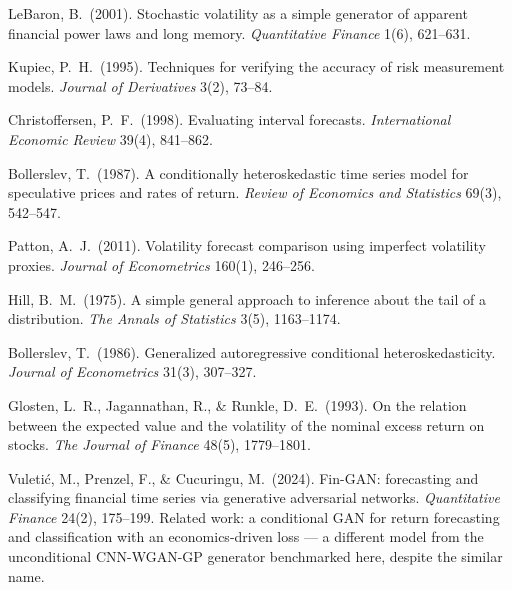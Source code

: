\documentclass[11pt,a4paper]{article}
\makeatletter
\DeclareRobustCommand{\_}{\ifmmode\nfss@text{\textunderscore}\else\textunderscore\allowbreak\fi}
\makeatother
\begin{document}
{\begin{enumerate}[label={\textbf{[\arabic*]}},leftmargin=2.8em,itemsep=4pt,parsep=0pt,topsep=2pt]
\item \hypertarget{R:33}{}%
  LeBaron, B.\ (2001). Stochastic volatility as a simple generator of apparent financial power laws and long memory. \textit{Quantitative Finance} 1(6), 621--631.

\item \hypertarget{R:34}{}%
  Kupiec, P.\ H.\ (1995). Techniques for verifying the accuracy of risk measurement models. \textit{Journal of Derivatives} 3(2), 73--84.

\item \hypertarget{R:35}{}%
  Christoffersen, P.\ F.\ (1998). Evaluating interval forecasts. \textit{International Economic Review} 39(4), 841--862.

\item \hypertarget{R:36}{}%
  Bollerslev, T.\ (1987). A conditionally heteroskedastic time series model for speculative prices and rates of return. \textit{Review of Economics and Statistics} 69(3), 542--547.

\item \hypertarget{R:37}{}%
  Patton, A.\ J.\ (2011). Volatility forecast comparison using imperfect volatility proxies. \textit{Journal of Econometrics} 160(1), 246--256.

\item \hypertarget{R:38}{}%
  Hill, B.\ M.\ (1975). A simple general approach to inference about the tail of a distribution. \textit{The Annals of Statistics} 3(5), 1163--1174.

\item \hypertarget{R:39}{}%
  Bollerslev, T.\ (1986). Generalized autoregressive conditional heteroskedasticity. \textit{Journal of Econometrics} 31(3), 307--327.

\item \hypertarget{R:40}{}%
  Glosten, L.\ R., Jagannathan, R., \& Runkle, D.\ E.\ (1993). On the relation between the expected value and the volatility of the nominal excess return on stocks. \textit{The Journal of Finance} 48(5), 1779--1801.

\item \hypertarget{R:41}{}%
  Vuleti\'{c}, M., Prenzel, F., \& Cucuringu, M.\ (2024). Fin-GAN: forecasting and classifying financial time series via generative adversarial networks. \textit{Quantitative Finance} 24(2), 175--199. Related work: a conditional GAN for return forecasting and classification with an economics-driven loss --- a different model from the unconditional CNN-WGAN-GP generator benchmarked here, despite the similar name.


\end{enumerate}}
\end{document}
